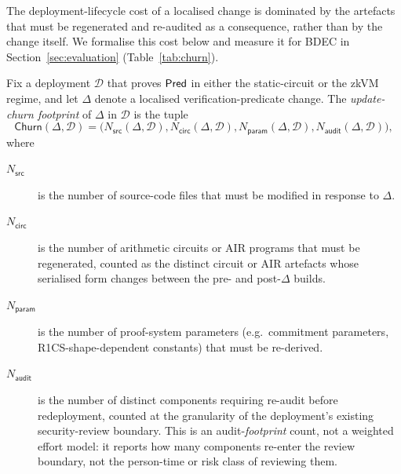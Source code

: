 The deployment-lifecycle cost of a localised change is dominated by the artefacts that must be regenerated and re-audited as a consequence, rather than by the change itself. We formalise this cost below and measure it for BDEC in Section~\ref{sec:evaluation} (Table~\ref{tab:churn}).

\begin{definition}\label{def:update-churn}
Fix a deployment $\mathcal D$ that proves $\mathsf{Pred}$ in either the static-circuit or the zkVM regime, and let $\Delta$ denote a localised verification-predicate change. The \emph{update-churn footprint} of $\Delta$ in $\mathcal D$ is the tuple
\begin{equation*}
  \mathsf{Churn}(\Delta,\mathcal D)
  =
  \bigl(
    N_{\mathsf{src}}(\Delta,\mathcal D),
    N_{\mathsf{circ}}(\Delta,\mathcal D),
    N_{\mathsf{param}}(\Delta,\mathcal D),
    N_{\mathsf{audit}}(\Delta,\mathcal D)
  \bigr),
\end{equation*}
where
\begin{description}
  \item[$N_{\mathsf{src}}$] is the number of source-code files that must be modified in response to $\Delta$.
  \item[$N_{\mathsf{circ}}$] is the number of arithmetic circuits or AIR programs that must be regenerated, counted as the distinct circuit or AIR artefacts whose serialised form changes between the pre- and post-$\Delta$ builds.
  \item[$N_{\mathsf{param}}$] is the number of proof-system parameters (e.g.\ commitment parameters, R1CS-shape-dependent constants) that must be re-derived.
  \item[$N_{\mathsf{audit}}$] is the number of distinct components requiring re-audit before redeployment, counted at the granularity of the deployment's existing security-review boundary. This is an audit-\emph{footprint} count, not a weighted effort model: it reports how many components re-enter the review boundary, not the person-time or risk class of reviewing them.
\end{description}
\end{definition}

